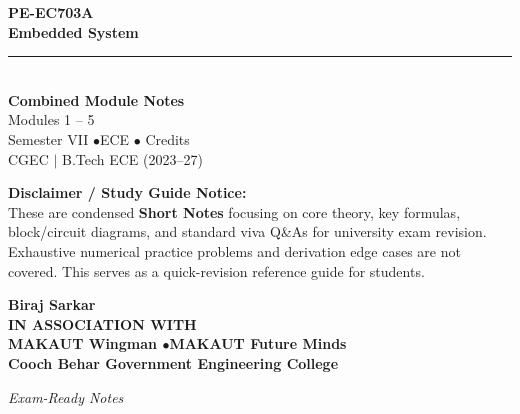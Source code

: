 \documentclass[12pt,a4paper]{article}
\begin{document}
\thispagestyle{empty}


\vspace*{1.0cm}
\begin{center}
  {\Huge\bfseries\color{myred} PE-EC703A}\\[10pt]
  {\LARGE\bfseries\color{mydark} Embedded System}\\[20pt]
  {\color{myred}\rule{0.7\linewidth}{1.5pt}}\\[18pt]
  {\Large\color{myteal}\textbf{Combined Module Notes}}\\[8pt]
  {\large\color{mydark} Modules 1 -- 5}\\[40pt]
  {\normalsize\color{mydark} Semester VII \quad$\bullet$\quad ECE \quad$\bullet$ Credits}\\[12pt]
  {\normalsize\color{mydark} CGEC \;$|$\; B.Tech ECE (2023--27)}
\end{center}
\vspace{1.0cm}
\begin{center}
  \begin{tcolorbox}[colback=mygray, colframe=mgframe, boxrule=0.5pt, arc=3pt, width=0.85\linewidth]
    \centering\small\color{mydark}
    \textbf{Disclaimer / Study Guide Notice:}\\
    These are condensed \textbf{Short Notes} focusing on core theory, key formulas, block/circuit diagrams, and standard viva Q\&As for university exam revision. Exhaustive numerical practice problems and derivation edge cases are not covered. This serves as a quick-revision reference guide for students.
  \end{tcolorbox}
\end{center}
\vfill
\vspace{0.6cm}
\begin{center}
  {\large\bfseries\color{mypurple} Biraj Sarkar}\\[16pt]
  {\footnotesize\color{watermark}\textbf{IN ASSOCIATION WITH}}\\[8pt]
  {\small\bfseries\color{mydark} MAKAUT Wingman \quad$\bullet$\quad MAKAUT Future Minds}\\[12pt]
  {\large\bfseries\color{myteal} Cooch Behar Government Engineering College}
\end{center}
\vfill
\begin{center}{\small\color{watermark}\textit{Exam-Ready Notes}}\end{center}
\clearpage
\end{document}
